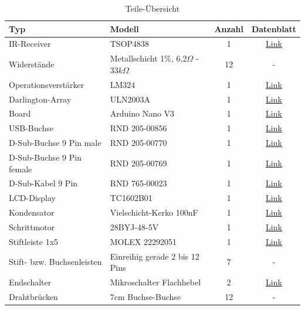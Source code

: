 \documentclass[11pt, titlepage]{report}
\begin{document}
			\hspace{5em}
			\begin{table}[htbp]
				\centering
				\caption{Teile-Übersicht}
				\begin{tabular}{llcc}
					\toprule
					\textbf{Typ} & \textbf{Modell} & \textbf{Anzahl} & \textbf{Datenblatt} \\
					\midrule
					IR-Receiver 			& TSOP4838 			& 1 & \href{https://cdn-reichelt.de/documents/datenblatt/A500/TSOP48XX.PDF}{Link} \\
					Widerstände 			& Metallschicht 1\%, 6,2$\Omega$ - 33$k\Omega$ & 12 & - \\
					Operationsverstärker 	& LM324 			& 1 &  \href{http://www.bonafidecn.com/PDF/UTC/OP\%20Amplifiers/LM324.pdf}{Link}\\
					Darlington-Array		& ULN2003A 			& 1 & \href{https://cdn-reichelt.de/documents/datenblatt/A200/ULN2001A_ULN2002A_ULN2003A_ULN2004A\%23STM.pdf}{Link} \\
					Board					& Arduino Nano V3 	& 1 & \href{https://www.arduino.cc/en/uploads/Main/ArduinoNanoManual23.pdf}{Link} \\
					USB-Buchse 				& RND 205-00856 	& 1 & \href{https://cdn-reichelt.de/documents/datenblatt/C300/RND\%20205-00856_ENG_TDS.pdf}{Link}\\
					D-Sub-Buchse 9 Pin male & RND 205-00770		& 1 & \href{https://cdn-reichelt.de/documents/datenblatt/C300/RND\%20205-00770_ENG_TDS.pdf}{Link}\\
					D-Sub-Buchse 9 Pin female & RND 205-00769 	& 1 & \href{https://cdn-reichelt.de/documents/datenblatt/C120/RND_205-00769_ENG_TDS.pdf}{Link}\\
					D-Sub-Kabel 9 Pin 		& RND 765-00023		& 1 & \href{https://cdn-reichelt.de/documents/datenblatt/C610/RND_765-00022_00027_DB-EN.pdf}{Link}\\
					LCD-Display				& TC1602B01			& 1 & \href{https://github.com/derTino89/RotaCon/blob/master/Datenbl\%C3\%A4tter/LCD1602.pdf}{Link}\\
					Kondensator 			& Vielschicht-Kerko 100nF & 1 & \href{https://cdn-reichelt.de/documents/datenblatt/B300/HITANO-S-SERIES_ENG_TDS.pdf}{Link}\\
					Schrittmotor			& 28BYJ-48-5V		& 1 & \href{https://www.digikey.at/de/datasheets/mikroelektronika/mikroelektronika-step-motor-5v-28byj48-datasheet}{Link}\\
					Stiftleiste 1x5 		& MOLEX 22292051	& 1 & \href{https://cdn-reichelt.de/documents/datenblatt/C160/04380804.pdf}{Link}\\
					Stift- bzw. Buchsenleisten	& Einreihig gerade 2 bis 12 Pins & 7 & - \\
					Endschalter				& Mikroschalter Flachhebel & 2 &\href{https://cdn-reichelt.de/documents/datenblatt/C200/AVX3_DB_EN.pdf}{Link}\\
					Drahtbrücken			& 7cm Buchse-Buchse	& 12 & -\\

				\end{tabular}
			\end{table}			
\end{document}
